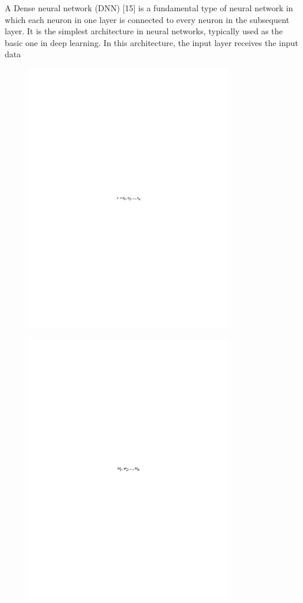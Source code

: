 A Dense neural network (DNN) {[}15{]} is a fundamental type of neural
network in which each neuron in one layer is connected to every neuron
in the subsequent layer. It is the simplest architecture in neural
networks, typically used as the basic one in deep learning. In this
architecture, the input layer receives the input data
\begin{figure}[H]
	\centering
	\includegraphics[width=0.8\textwidth]{media/ict/image41}
	\caption*{}
\end{figure}

\begin{figure}[H]
	\centering
	\includegraphics[width=0.8\textwidth]{media/ict/image42}
	\caption*{}
\end{figure}

